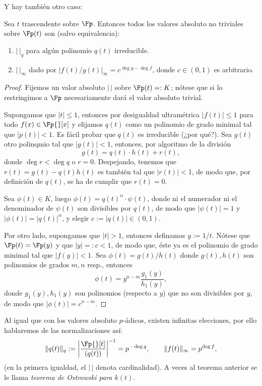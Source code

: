 \documentclass[teoria-numeros.tex]{subfiles}
\begin{document}
Y hay también otro caso:
\begin{thmi}
	Sea $t$ trascendente sobre $\Fp$.
	Entonces todos los valores absoluto no triviales sobre $\Fp(t)$ son (salvo equivalencia):
	\begin{enumerate}
		\item $|\,|_q$ para algún polinomio $q(t)$ irreducible.
		\item $|\,|_\infty$ dado por $|f(t)/g(t)|_\infty = c^{\deg g - \deg f}$, donde $c \in (0, 1)$ es arbitrario.
	\end{enumerate}
\end{thmi}
\begin{proof}
	Fijemos un valor absoluto $|\,|$ sobre $\Fp(t) =: K$; nótese que si lo restringimos a $\Fp$ necesariamente dará el valor absoluto trivial.

	Supongamos que $|t| \le 1$, entonces por desigualdad ultramétrica $|f(t)| \le 1$ para todo $f(x) \in \Fp{}[x]$
	y elijamos $q(t)$ como un polinomio de grado minimal tal que $|p(t)| < 1$.
	Es fácil probar que $q(t)$ es irreducible (¿por qué?).
	Sea $g(t)$ otro polinqmio tal que $|g(t)| < 1$, entonces, por algoritmo de la división
	$$ g(t) = q(t) \cdot h(t) + r(t), $$
	donde $\deg r < \deg q$ o $r = 0$.
	Despejando, tenemos que $r(t) = g(t) - q(t)h(t)$ es también tal que $|r(t)| < 1$, de modo que, por definición de $q(t)$,
	se ha de cumplir que $r(t) = 0$.

	Sea $\phi(t) \in K$, luego $\phi(t) = q(t)^\alpha \cdot \psi(t)$, donde ni el numerador ni el denominador de $\psi(t)$ son divisibles por $q(t)$,
	de modo que $|\psi(t)| = 1$ y $|\phi(t)| = |q(t)|^\alpha$, y elegir $c := |q(t)| \in (0, 1)$.

	Por otro lado, supongamos que $|t| > 1$, entonces definamos $y := 1/t$.
	Nótese que $\Fp(t) = \Fp(y)$ y que $|y| =: c < 1$, de modo que, éste ya es el polinomio de grado minimal tal que $|f(y)| < 1$.
	Sea $\phi(t) = g(t)/h(t)$ donde $g(t), h(t)$ son polinomios de grados $m, n$ resp., entonces
	$$ \phi(t) = y^{n-m} \frac{g_1(y)}{h_1(y)}, $$
	donde $g_1(y), h_1(y)$ son polinomios (respecto a $y$) que no son divisibles por $y$, de modo que $| \phi(t) | = c^{n-m}$.
\end{proof}
Al igual que con los valores absoluto $p$-ádicos, existen infinitas elecciones, por ello hablaremos de las normalizaciones así:
$$ \| q(t) \|_q := \left| \frac{\Fp{}[t]}{(q(t))} \right|^{-1} = p^{-\deg q}, \qquad \|f(t)\|_\infty = p^{\deg f}, $$
(en la primera igualdad, el $|\,|$ denota cardinalidad).
A veces al teorema anterior se le llama \textit{teorema de Ostrowski para $k(t)$.} 
\end{document}
